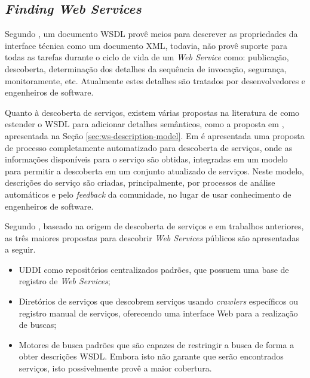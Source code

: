 \subsection{\textit{Finding Web Services} \cite{lausen2007finding}} \label{sec:finding-ws}

Segundo \cite{lausen2007finding}, um documento WSDL provê meios para descrever as propriedades da interface técnica como um documento XML, todavia, não provê suporte para todas as tarefas durante o ciclo de vida de um \textit{Web Service} como: publicação, descoberta, determinação dos detalhes da sequência de invocação, segurança, monitoramente, etc. Atualmente estes detalhes são tratados por desenvolvedores e engenheiros de software.

Quanto à descoberta de serviços, existem várias propostas na literatura de como estender o WSDL para adicionar detalhes semânticos, como a proposta em \cite{wu2009new}, apresentada na Seção \ref{sec:ws-description-model}.
Em \cite{lausen2007finding} é apresentada uma proposta de processo completamente automatizado para descoberta de serviços, onde as informações disponíveis para o serviço são obtidas, integradas em um modelo para permitir a descoberta em um conjunto atualizado de serviços. Neste modelo, descrições do serviço são criadas, principalmente, por processos de análise automáticos e pelo \textit{feedback} da comunidade, no lugar de usar conhecimento de engenheiros de software.

Segundo \cite{lausen2007finding}, baseado na origem de descoberta de serviços e em trabalhos anteriores, as três maiores propostas para descobrir \textit{Web Services} públicos são apresentadas a seguir.

\begin{itemize}
	\item UDDI como repositórios centralizados padrões, que possuem uma base de registro de \textit{Web Services};
  \item Diretórios de serviços que descobrem serviços usando \textit{crawlers} específicos ou registro manual de serviços, oferecendo uma interface Web para a realização de buscas;
  \item Motores de busca padrões que são capazes de restringir a busca de forma a obter descrições WSDL. Embora isto não garante que serão encontrados serviços, isto possivelmente provê a maior cobertura.
\end{itemize}

